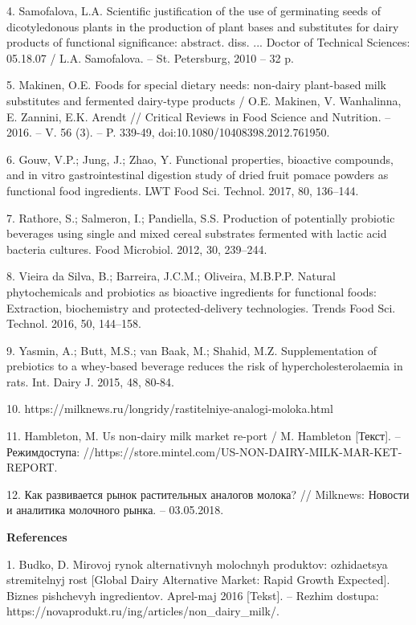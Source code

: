 4. Samofalova, L.A. Scientific justification of the use of germinating
seeds of dicotyledonous plants in the production of plant bases and
substitutes for dairy products of functional significance: abstract.
diss. ... Doctor of Technical Sciences: 05.18.07 / L.A. Samofalova. --
St. Petersburg, 2010 -- 32 p.

5. Makinen, O.E. Foods for special dietary needs: non-dairy plant-based
milk substitutes and fermented dairy-type products / O.E. Makinen, V.
Wanhalinna, E. Zannini, E.K. Arendt // Critical Reviews in Food Science
and Nutrition. -- 2016. -- V. 56 (3). -- P. 339-49,
doi:10.1080/10408398.2012.761950.

6. Gouw, V.P.; Jung, J.; Zhao, Y. Functional properties, bioactive
compounds, and in vitro gastrointestinal digestion study of dried fruit
pomace powders as functional food ingredients. LWT Food Sci. Technol.
2017, 80, 136--144.

7. Rathore, S.; Salmeron, I.; Pandiella, S.S. Production of potentially
probiotic beverages using single and mixed cereal substrates fermented
with lactic acid bacteria cultures. Food Microbiol. 2012, 30, 239--244.

8. Vieira da Silva, B.; Barreira, J.C.M.; Oliveira, M.B.P.P. Natural
phytochemicals and probiotics as bioactive ingredients for functional
foods: Extraction, biochemistry and protected-delivery technologies.
Trends Food Sci. Technol. 2016, 50, 144--158.

9. Yasmin, A.; Butt, M.S.; van Baak, M.; Shahid, M.Z. Supplementation of
prebiotics to a whey-based beverage reduces the risk of
hypercholesterolaemia in rats. Int. Dairy J. 2015, 48, 80-84.

10. https://milknews.ru/longridy/rastitelniye-analogi-moloka.html

11. Hambleton, M. Us non-dairy milk market re-port / M. Hambleton
{[}Текст{]}. -- Режимдоступа:
//https://store.mintel.com/US-NON-DAIRY-MILK-MAR-KET-REPORT.

12. Как развивается рынок растительных аналогов молока? // Milknews:
Новости и аналитика молочного рынка. -- 03.05.2018.

{\bfseries References}

1. Bud\textquotesingle ko, D. Mirovoj rynok
al\textquotesingle ternativnyh molochnyh produktov: ozhidaetsya
stremitel\textquotesingle nyj rost {[}Global Dairy Alternative Market:
Rapid Growth Expected{]}. Biznes pishchevyh ingredientov.
Aprel\textquotesingle-maj 2016 {[}Tekst{]}. -- Rezhim dostupa:
https://novaprodukt.ru/ing/articles/non\_dairy\_milk/.

